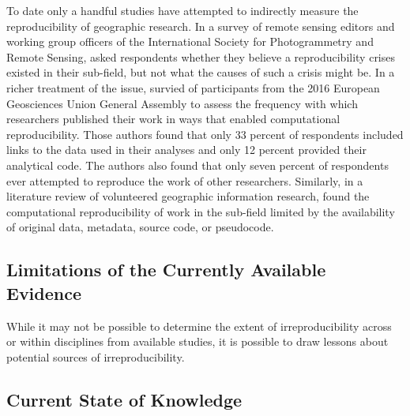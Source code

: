 \documentclass[]{interact}
\theoremstyle{plain}%
\theoremstyle{definition}
\theoremstyle{remark}
\begin{document}
To date only a handful studies have attempted to indirectly measure the reproducibility of geographic research.
In a survey of remote sensing editors and working group officers of the International Society for Photogrammetry and Remote Sensing, \citet{balz2020reproducibility} asked respondents whether they believe a reproducibility crises existed in their sub-field, but not what the causes of such a crisis might be.
In a richer treatment of the issue, \citet{konkol2019} survied of participants from the 2016 European Geosciences Union General Assembly to assess the frequency with which researchers published their work in ways that enabled computational reproducibility. 
Those authors found that only 33 percent of respondents included links to the data used in their analyses and only 12 percent provided their analytical code. 
The authors also found that only seven percent of respondents ever attempted to reproduce the work of other researchers.
Similarly, in a literature review of volunteered geographic information research, \citet{ostermann2017} found the computational reproducibility of work in the sub-field limited by the availability of original data, metadata, source code, or pseudocode.






\subsection*{Limitations of the Currently Available Evidence}
While it may not be possible to determine the extent of irreproducibility across or within disciplines from available studies, it is possible to draw lessons about potential sources of irreproducibility.





\subsection*{Current State of Knowledge}
\end{document}
